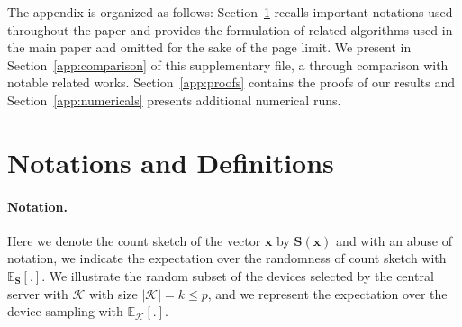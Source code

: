 \documentclass[11pt]{article}
\begin{document}
\vspace{0.5in}

The appendix is organized as follows:
Section~\ref{app:notations} recalls important notations used throughout the paper and provides the formulation of related algorithms used in the main paper and omitted for the sake of the page limit.
We present in Section~\ref{app:comparison} of this supplementary file, a through comparison with notable related works.
Section~\ref{app:proofs} contains the proofs of our results and Section~\ref{app:numericals} presents additional numerical runs.

\section{Notations and Definitions}\label{app:notations}

\paragraph{Notation.} Here we denote the count sketch of the vector $\boldsymbol{x}$ by $\mathbf{S}(\boldsymbol{x})$ and with an abuse of notation, we indicate the expectation over the randomness of count sketch with $\mathbb{E}_{\mathbf{S}}[.]$. 
We illustrate the random subset of the devices selected by the central server with $\mathcal{K}$ with size $|\mathcal{K}|=k\leq p$, and we represent the expectation over the device sampling with $\mathbb{E}_{\mathcal{K}}[.]$. 
\end{document}
